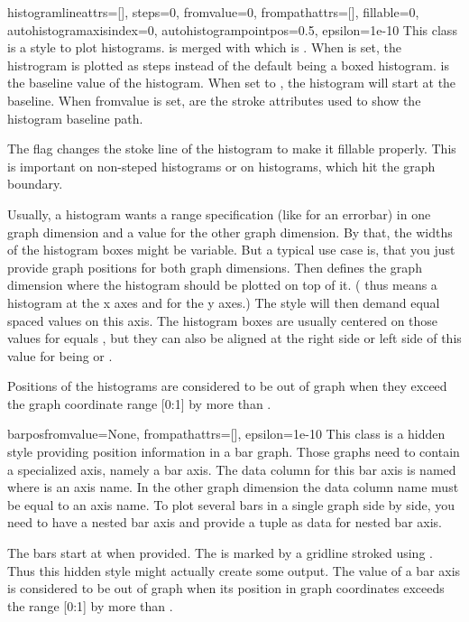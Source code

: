 \begin{classdesc}{histogram}{lineattrs=[], steps=0, fromvalue=0, %
                             frompathattrs=[], fillable=0,
                             autohistogramaxisindex=0,
                             autohistogrampointpos=0.5, epsilon=1e-10}
  This class is a style to plot histograms.  is merged
  with  which is . When
   is set, the histrogram is plotted as steps instead of
  the default being a boxed histogram.  is the baseline
  value of the histogram. When set to , the histogram will
  start at the baseline. When fromvalue is set, 
  are the stroke attributes used to show the histogram baseline path.

  The  flag changes the stoke line of the histogram to
  make it fillable properly. This is important on non-steped
  histograms or on histograms, which hit the graph boundary.

  Usually, a histogram wants a range specification (like for an
  errorbar) in one graph dimension and a value for the other graph
  dimension. By that, the widths of the histogram boxes might be
  variable. But a typical use case is, that you just provide graph
  positions for both graph dimensions. Then
   defines the graph dimension where the
  histogram should be plotted on top of it. ( thus means a
  histogram at the x axes and  for the y axes.) The style will
  then demand equal spaced values on this axis. The histogram boxes
  are usually centered on those values for 
  equals , but they can also be aligned at the right side or
  left side of this value for  being
   or .

  Positions of the histograms are considered to be out of graph when
  they exceed the graph coordinate range [0:1] by more than
  .
\end{classdesc} %

\begin{classdesc}{barpos}{fromvalue=None, frompathattrs=[], epsilon=1e-10} %
  This class is a hidden style providing position information in a bar
  graph. Those graphs need to contain a specialized axis, namely a bar
  axis. The data column for this bar axis is named  where
   is an axis name. In the other graph dimension the data
  column name must be equal to an axis name. To plot several bars in a
  single graph side by side, you need to have a nested bar axis and
  provide a tuple as data for nested bar axis.

  The bars start at  when provided. The 
  is marked by a gridline stroked using . Thus this
  hidden style might actually create some output. The value of a bar
  axis is considered to be out of graph when its position in graph
  coordinates exceeds the range [0:1] by more than .
\end{classdesc} %

